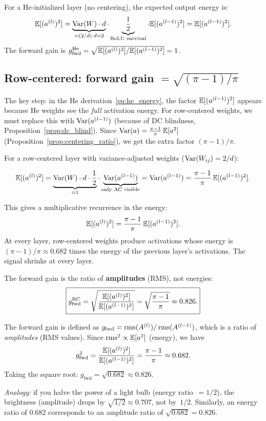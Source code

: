 For a He-initialized layer (no centering), the expected output energy
is:
\begin{equation}\label{eq:he_energy}
  \mathbb{E}[(a^{(l)})^2]
  = \underbrace{\operatorname{Var}(W) \cdot d}_{= (2/d)\cdot d = 2}
  \cdot \underbrace{\frac{1}{2}}_{\text{ReLU survival}}
  \cdot \mathbb{E}[(a^{(l-1)})^2]
  = \mathbb{E}[(a^{(l-1)})^2].
\end{equation}
The forward gain is $g_{\mathrm{fwd}}^{\mathrm{He}} = \sqrt{\mathbb{E}[(a^{(l)})^2] / \mathbb{E}[(a^{(l-1)})^2]} = 1$.

\subsection{Row-centered: forward gain $= \sqrt{(\pi-1)/\pi}$}

The key step: in the He derivation~\eqref{eq:he_energy}, the factor
$\mathbb{E}[(a^{(l-1)})^2]$ appears because He weights see the \emph{full}
activation energy.  For row-centered weights, we must replace this
with $\operatorname{Var}(a^{(l-1)})$ (because of DC blindness,
Proposition~\ref{prop:dc_blind}).  Since
$\operatorname{Var}(a) = \frac{\pi-1}{\pi}\,\mathbb{E}[a^2]$
(Proposition~\ref{prop:centering_ratio}), we get the extra factor
$(\pi-1)/\pi$.

For a row-centered layer with variance-adjusted weights
($\operatorname{Var}(W_{ij}) = 2/d$):

\begin{equation}\label{eq:rc_energy}
  \mathbb{E}[(a^{(l)})^2]
  = \underbrace{\operatorname{Var}(W) \cdot d \cdot \frac{1}{2}}_{= 1}
  \cdot \underbrace{\operatorname{Var}(a^{(l-1)})}_{\text{only AC visible}}
  = \operatorname{Var}(a^{(l-1)})
  = \frac{\pi-1}{\pi}\,\mathbb{E}[(a^{(l-1)})^2].
\end{equation}

This gives a multiplicative recurrence in the energy:
\[
  \mathbb{E}[(a^{(l)})^2] = \frac{\pi-1}{\pi}\,\mathbb{E}[(a^{(l-1)})^2].
\]
At every layer, row-centered weights produce activations whose energy
is $(\pi-1)/\pi \approx 0.682$ times the energy of the previous
layer's activations.  The signal shrinks at every layer.

The forward gain is the ratio of \textbf{amplitudes} (RMS), not energies:
\begin{equation}\label{eq:rc_fwd_gain}
  \boxed{
  g_{\mathrm{fwd}}^{\mathrm{RC}}
  = \sqrt{\frac{\mathbb{E}[(a^{(l)})^2]}{\mathbb{E}[(a^{(l-1)})^2]}}
  = \sqrt{\frac{\pi-1}{\pi}}
  \approx 0.826.
  }
\end{equation}

\begin{remark}
\label{rem:amplitude}
The forward gain is defined as
$g_{\mathrm{fwd}} = \operatorname{rms}(A^{(l)}) / \operatorname{rms}(A^{(l-1)})$,
which is a ratio of \emph{amplitudes} (RMS values).
Since $\operatorname{rms}^2 \propto \mathbb{E}[a^2]$ (energy), we have
\[
  g_{\mathrm{fwd}}^2
  = \frac{\mathbb{E}[(a^{(l)})^2]}{\mathbb{E}[(a^{(l-1)})^2]}
  = \frac{\pi-1}{\pi}
  \approx 0.682.
\]
Taking the square root:
$g_{\mathrm{fwd}} = \sqrt{0.682} \approx 0.826$.

\emph{Analogy:} if you halve the power of a light bulb
(energy ratio~$= 1/2$), the brightness (amplitude) drops by
$\sqrt{1/2} \approx 0.707$, not by~$1/2$.
Similarly, an energy ratio of $0.682$ corresponds to an amplitude
ratio of $\sqrt{0.682} = 0.826$.
\end{remark}

